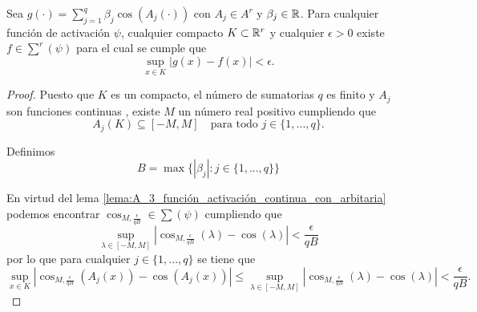 \begin{lema}\label{lema:A_4_sum_cos_aproxima}
    Sea $g(\cdot) = \sum_{j=1}^q \beta_j \cos(A_j(\cdot))$ con 
    $A_j \in A^r$ y $\beta_j \in \mathbb{R}$.
    Para cualquier función de activación $\psi$, 
    cualquier compacto $K \subset \mathbb{R}^r$
    y cualquier $\epsilon > 0$
    existe $f \in \sum^r(\psi)$ para el cual se cumple que 
    \begin{equation}
        \sup_{x \in K} 
        |g(x) - f(x)| < \epsilon.
    \end{equation}
\end{lema}
\begin{proof}
    Puesto que $K$ es un compacto, el número de sumatorias $q$
    es finito y $A_j$ son funciones continuas
    , existe
     $M$ un número real positivo  cumpliendo que
    \begin{equation}
        A_j(K) \subseteq [-M, M] 
        \quad 
        \text{para todo } j \in \{1, ..., q \}. 
    \end{equation} 

    Definimos  
    \begin{equation}
        B = \max \{ |\beta_j| :  j \in \{1, ..., q \}\}
    \end{equation}

    En virtud del lema \ref{lema:A_3_función_activación_continua_con_arbitaria}
    podemos encontrar
    $\cos_{M, \frac{\epsilon}{q B}} \in \sum(\psi)$ cumpliendo que
    \begin{equation}
        \sup_{\lambda \in [-M, M]} | 
        \cos_{M, \frac{\epsilon}{q B}}(\lambda)
        - 
        \cos(\lambda)
        | 
        < \frac{\epsilon}{q B} 
    \end{equation}
    por lo que para cualquier  $j \in \{1, ..., q \}$   se tiene que 
    \begin{equation}
        \sup_{x \in K} | 
        \cos_{M, \frac{\epsilon}{q B}}(A_j(x))
        - 
        \cos(A_j(x))
        | 
        \leq  
        \sup_{\lambda \in [-M, M]} | 
        \cos_{M, \frac{\epsilon}{q B}}(\lambda)
        - 
        \cos(\lambda)
        | 
        < \frac{\epsilon}{q B}. 
    \end{equation}


\end{proof}
